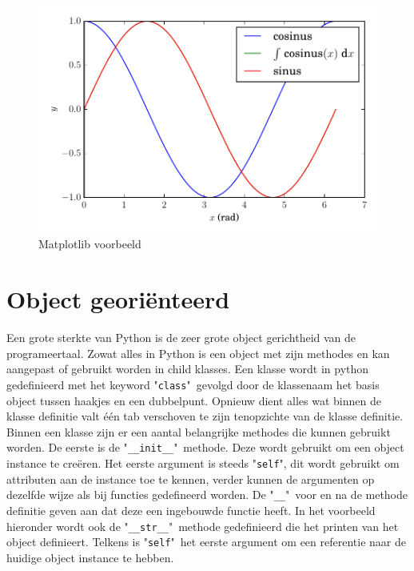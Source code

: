 \documentclass[11pt,twoside]{article}
\begin{document}
\begin{figure}[ht]
	\centering
	\includegraphics[scale=0.5]{examples/sinus_cosinus}
	\caption{Matplotlib voorbeeld}
	\label{fig:sinus_cosinus}
\end{figure}

	\section{Object georiënteerd} 
Een grote sterkte van Python is de zeer grote object gerichtheid van de programeertaal. Zowat alles in Python is een object met zijn methodes en kan aangepast of gebruikt worden in child klasses. Een klasse wordt in python gedefinieerd met het keyword "\lstinline{class}"\ gevolgd door de klassenaam het basis object tussen haakjes en een dubbelpunt. Opnieuw dient alles wat binnen de klasse definitie valt één tab verschoven te zijn tenopzichte van de klasse definitie. Binnen een klasse zijn er een aantal belangrijke methodes die kunnen gebruikt worden. De eerste is de "\lstinline{__init__}"\ methode. Deze wordt gebruikt om een object instance te creëren. Het eerste argument is steeds "\lstinline{self}", dit wordt gebruikt om attributen aan de instance toe te kennen, verder kunnen de argumenten op dezelfde wijze als bij functies gedefineerd worden. De "\lstinline{__}"\ voor en na de methode definitie geven aan dat deze een ingebouwde functie heeft. In het voorbeeld hieronder wordt ook de "\lstinline{__str__}"\ methode gedefinieerd die het printen van het object definieert. Telkens is "\lstinline{self}"\ het eerste argument om een referentie naar de huidige object instance te hebben.
\end{document}

